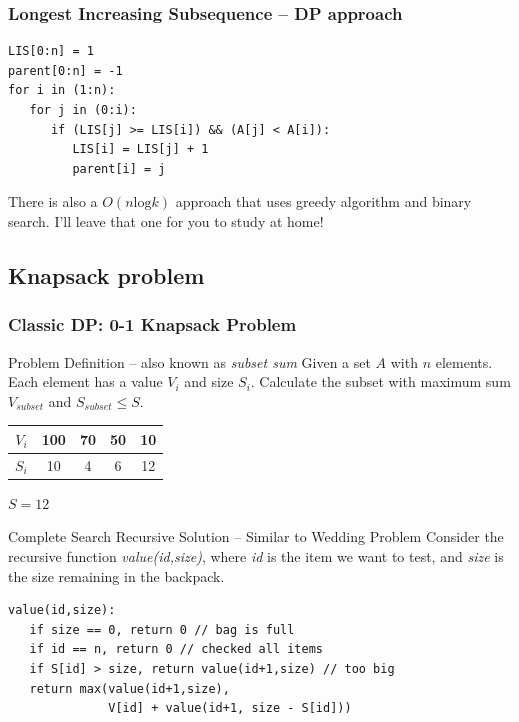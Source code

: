 \documentclass{beamer}
\begin{document}
\begin{frame}[fragile]
  \frametitle{Longest Increasing Subsequence -- DP approach}
  \begin{block}{}
  {\small
\begin{verbatim}
LIS[0:n] = 1
parent[0:n] = -1
for i in (1:n):
   for j in (0:i):
      if (LIS[j] >= LIS[i]) && (A[j] < A[i]):
         LIS[i] = LIS[j] + 1
         parent[i] = j
\end{verbatim}
  }
  \end{block}

\vfill

\begin{block}{}
  There is also a $O(n\text{log}k)$ approach that uses greedy
  algorithm and binary search. I'll leave that one for you to study at home!
\end{block}
\end{frame}

\subsection{Knapsack problem}
\begin{frame}[fragile]
  \frametitle{Classic DP: 0-1 Knapsack Problem}
  {\smaller
  \begin{block}{Problem Definition -- also known as \emph{subset sum}}
    Given a set $A$ with $n$ elements. Each element has a value $V_i$
    and size $S_i$. Calculate the subset with maximum sum
    $V_{subset}$ and $S_{subset} \leq S$.
  \end{block}

  \medskip

  \begin{tabular}{|c|c|c|c|c|}
    \hline
    $V_i$ & 100 & 70 & 50 & 10\\
    \hline
    $S_i$ & 10 & 4 & 6 & 12\\
    \hline
  \end{tabular}

  \smallskip

  $S = 12$

  \begin{block}{Complete Search Recursive Solution -- Similar to Wedding Problem}
    Consider the recursive function \emph{value(id,size)}, where
    \emph{id} is the item we want to test, and \emph{size} is the size
    remaining in the backpack.

    \medskip

\begin{verbatim}
value(id,size):
   if size == 0, return 0 // bag is full
   if id == n, return 0 // checked all items
   if S[id] > size, return value(id+1,size) // too big
   return max(value(id+1,size),
              V[id] + value(id+1, size - S[id]))
\end{verbatim}
  \end{block}
  }
\end{frame}
\end{document}

